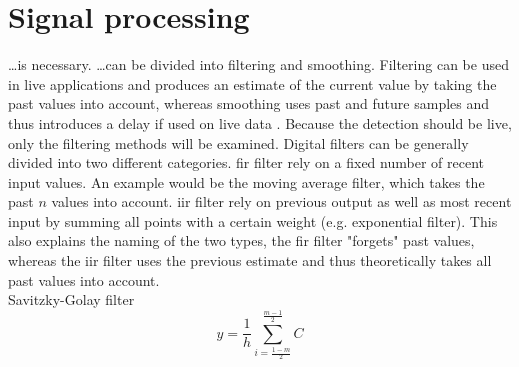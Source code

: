\section{Signal processing}
\dots is necessary.
\dots can be divided into filtering and smoothing.
Filtering can be used in live applications and produces an estimate of the current value by taking the past values into account, whereas smoothing uses past and future samples and thus introduces a delay if used on live data .
Because the detection should be live, only the filtering methods will be examined.
Digital filters can be generally divided into two different categories.
\gls{fir} filter rely on a fixed number of recent input values. An example would be the moving average filter, which takes the past $n$ values into account.
\gls{iir} filter rely on previous output as well as most recent input by summing all points with a certain weight (e.g. exponential filter).
This also explains the naming of the two types, the \gls{fir} filter "forgets" past values, whereas the \gls{iir} filter uses the previous estimate and thus theoretically takes all past values into account.\\
Savitzky-Golay filter
\begin{equation}
	y = \frac{1}{h}\sum_{i =\frac{1 - m}{2}}^{\frac{m - 1}{2}}C
\end{equation}